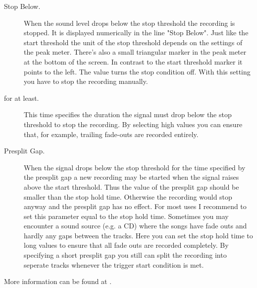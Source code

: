 \begin{description}
  \item[Stop Below.]
	When the sound level drops below the stop threshold the recording is stopped.
	It is displayed numerically in the line "Stop Below". Just like the start
	threshold the unit of the stop threshold depends on the settings of the peak
	meter. There's also a small triangular marker in the peak meter at the bottom
	of the screen. In contrast to the start threshold marker it points to the
	left. The value  turns the stop condition off. With this setting you
	have to stop the recording manually.
	
  \item[for at least.]
    This time specifies the duration the signal must drop below the stop
	threshold to stop the recording. By selecting high values you can ensure
	that, for example, trailing fade-outs are recorded entirely.
	
  \item[Presplit Gap.]
    When the signal drops below the stop threshold for the time specified by the
	presplit gap a new recording may be started when the signal raises above the
	start threshold. Thus the value of the presplit gap should be smaller than
	the stop hold time. Otherwise the recording would stop anyway and the
	presplit gap has no effect. For most uses I recommend to set this parameter
	equal to the stop hold time. Sometimes you may encounter a sound source (e.g.
	a CD) where the songs have fade outs and hardly any gaps between the tracks.
	Here you can set the stop hold time to long values to ensure that all fade
	outs are recorded completely. By specifying a short presplit gap you still
	can split the recording into seperate tracks whenever the trigger start
	condition is met.
	
  \end{description}
  
More information can be found at .
  
